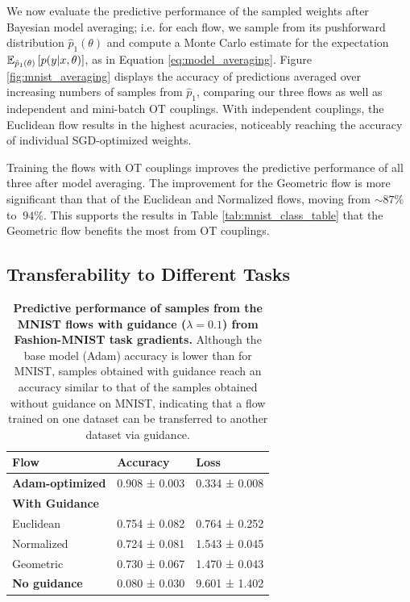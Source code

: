 We now evaluate the predictive performance of the sampled weights after Bayesian model averaging; i.e. for each flow, we sample from its pushforward distribution $\hat p_1 (\theta)$ and compute a Monte Carlo estimate for the expectation $\mathbb{E}_{\hat p_1 (\theta)} \left[ p(y\vert x, \theta) \right]$, as in Equation \ref{eq:model_averaging}. Figure \ref{fig:mnist_averaging} displays the accuracy of predictions averaged over increasing numbers of samples from $\hat p_1$, comparing our three flows as well as independent and mini-batch OT couplings. With independent couplings, the Euclidean flow results in the highest acuracies, noticeably reaching the accuracy of individual SGD-optimized weights. 

Training the flows with OT couplings improves the predictive performance of all three after model averaging. The improvement for the Geometric flow is more significant than that of the Euclidean and Normalized flows, moving from $\sim87\%$ to $~94\%$. This supports the results in Table \ref{tab:mnist_class_table} that the Geometric flow benefits the most from OT couplings. 

\subsection{Transferability to Different Tasks} \label{sec:task_generalization}

\begin{table}[t!]
    \centering
    \begin{tabular}{lll}
        \toprule
        \textbf{Flow} & \textbf{Accuracy} & \textbf{Loss} \\
        \midrule
        \textbf{Adam-optimized} & 0.908 ± 0.003 & 0.334 ± 0.008 \\
        \midrule
        \textbf{With Guidance} & & \\
        Euclidean   & 0.754 ± 0.082     & 0.764 ± 0.252 \\
        Normalized  & 0.724 ± 0.081     & 1.543 ± 0.045 \\
        Geometric   & 0.730 ± 0.067     & 1.470 ± 0.043 \\
        \midrule
        \textbf{No guidance} & 0.080 ± 0.030 & 9.601 ± 1.402 \\ 
        \bottomrule
    \end{tabular}
    \caption{\label{tab:mnist_generalization}\textbf{Predictive performance of samples from the MNIST flows with guidance ($\lambda = 0.1$) from Fashion-MNIST task gradients.} Although the base model (Adam) accuracy is lower than for MNIST, samples obtained with guidance reach an accuracy similar to that of the samples obtained without guidance on MNIST, indicating that a flow trained on one dataset can be transferred to another dataset via guidance. }
\end{table}

